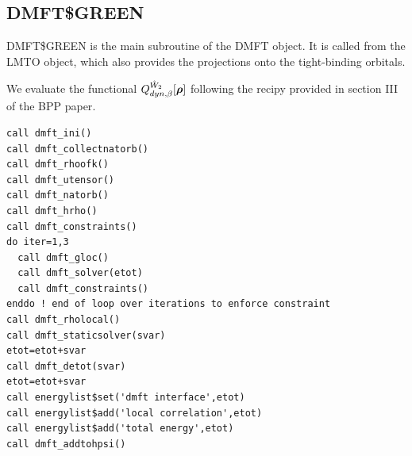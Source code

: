 \documentclass[11pt,a4paper]{report}
\begin{document}
\subsection{DMFT\$GREEN}
DMFT\$GREEN is the main subroutine of the DMFT object. It is called
from the LMTO object, which also provides the  projections onto the
tight-binding orbitals.

We evaluate the functional $Q^{\hat{W}_2}_{dyn,\beta}[\bm{\rho}]$
following the recipy provided in section III of the BPP
paper\cite{bloechl13_prb88_25139}.

\begin{verbatim}
call dmft_ini()
call dmft_collectnatorb()  
call dmft_rhoofk()  
call dmft_utensor() 
call dmft_natorb()
call dmft_hrho()
call dmft_constraints()
do iter=1,3
  call dmft_gloc() 
  call dmft_solver(etot) 
  call dmft_constraints()
enddo ! end of loop over iterations to enforce constraint
call dmft_rholocal()
call dmft_staticsolver(svar) 
etot=etot+svar
call dmft_detot(svar)
etot=etot+svar      
call energylist$set('dmft interface',etot)
call energylist$add('local correlation',etot)
call energylist$add('total energy',etot)
call dmft_addtohpsi()
\end{verbatim}
\end{document}

